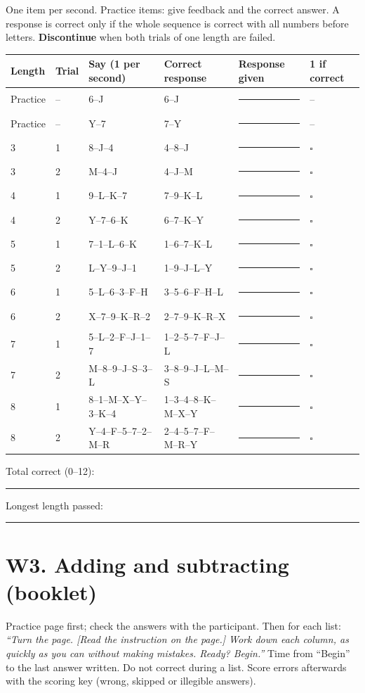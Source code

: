 \documentclass[10pt,a4paper]{article}
\newcommand{\blank}[1][1.2cm]{\rule{#1}{0.4pt}}
\newcommand{\bx}{$\square$}
\begin{document}
One item per second. Practice items: give feedback and the correct answer. A response is correct only if the whole sequence is correct with all numbers before letters. \textbf{Discontinue} when both trials of one length are failed.
\begin{longtable}{@{}llp{4.2cm}p{4.2cm}p{3.4cm}l@{}}\toprule Length & Trial & Say (1 per second) & Correct response & Response given & 1 if correct\\ \midrule\endhead
Practice & -- & 6--J & 6--J & \blank[3.2cm] & --\\
Practice & -- & Y--7 & 7--Y & \blank[3.2cm] & --\\
\midrule
3 & 1 & 8--J--4 & 4--8--J & \blank[3.2cm] & \bx\\
3 & 2 & M--4--J & 4--J--M & \blank[3.2cm] & \bx\\\midrule
4 & 1 & 9--L--K--7 & 7--9--K--L & \blank[3.2cm] & \bx\\
4 & 2 & Y--7--6--K & 6--7--K--Y & \blank[3.2cm] & \bx\\\midrule
5 & 1 & 7--1--L--6--K & 1--6--7--K--L & \blank[3.2cm] & \bx\\
5 & 2 & L--Y--9--J--1 & 1--9--J--L--Y & \blank[3.2cm] & \bx\\\midrule
6 & 1 & 5--L--6--3--F--H & 3--5--6--F--H--L & \blank[3.2cm] & \bx\\
6 & 2 & X--7--9--K--R--2 & 2--7--9--K--R--X & \blank[3.2cm] & \bx\\\midrule
7 & 1 & 5--L--2--F--J--1--7 & 1--2--5--7--F--J--L & \blank[3.2cm] & \bx\\
7 & 2 & M--8--9--J--S--3--L & 3--8--9--J--L--M--S & \blank[3.2cm] & \bx\\\midrule
8 & 1 & 8--1--M--X--Y--3--K--4 & 1--3--4--8--K--M--X--Y & \blank[3.2cm] & \bx\\
8 & 2 & Y--4--F--5--7--2--M--R & 2--4--5--7--F--M--R--Y & \blank[3.2cm] & \bx\\\midrule
\bottomrule\end{longtable}
Total correct (0--12): \blank \quad Longest length passed: \blank
\section*{W3. Adding and subtracting (booklet)}
Practice page first; check the answers with the participant. Then for each list: \textit{``Turn the page. [Read the instruction on the page.] Work down each column, as quickly as you can without making mistakes. Ready? Begin.''} Time from ``Begin'' to the last answer written. Do not correct during a list. Score errors afterwards with the scoring key (wrong, skipped or illegible answers).
\end{document}
